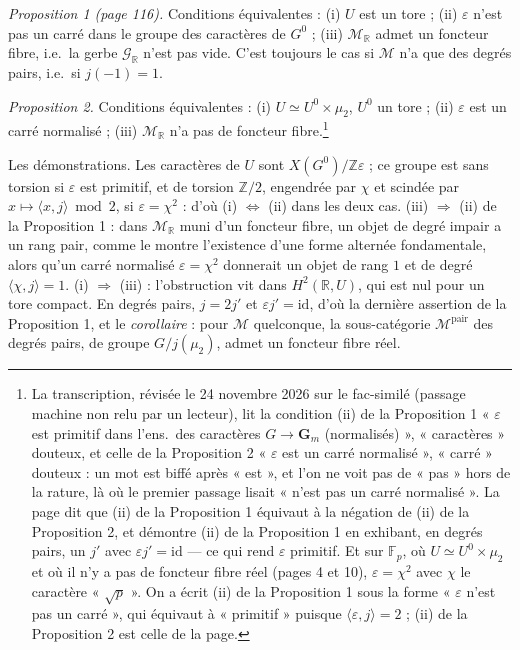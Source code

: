 \documentclass[11pt,a4paper]{article}
\begin{document}
\emph{Proposition 1 (page 116).} Conditions équivalentes : (i) $U$ est un tore ;
(ii) $\varepsilon$ n'est pas un carré dans le groupe des caractères de $G^{0}$ ;
(iii) $\mathcal{M}_{\mathbb{R}}$ admet un foncteur fibre, i.e.\ la gerbe
$\mathcal{G}_{\mathbb{R}}$ n'est pas vide. C'est toujours le cas si
$\mathcal{M}$ n'a que des degrés pairs, i.e.\ si $j(-1) = 1$.

\emph{Proposition 2.} Conditions équivalentes : (i) $U \simeq U^{0} \times
\mu_{2}$, $U^{0}$ un tore ; (ii) $\varepsilon$ est un carré normalisé ; (iii)
$\mathcal{M}_{\mathbb{R}}$ n'a pas de foncteur fibre.\footnote{La transcription,
révisée le 24 novembre 2026 sur le fac-similé (passage machine non relu par un
lecteur), lit la condition (ii) de la Proposition 1 « $\varepsilon$ est primitif
dans l'ens.\ des caractères $G \to \mathbf{G}_{m}$ (normalisés) », « caractères »
douteux, et celle de la Proposition 2 « $\varepsilon$ est un carré normalisé »,
« carré » douteux : un mot est biffé après « est », et l'on ne voit pas de
« pas » hors de la rature, là où le premier passage lisait « n'est pas un
carré normalisé ». La page dit
que (ii) de la Proposition 1 équivaut à la négation de (ii) de la
Proposition 2, et démontre (ii) de la Proposition 1 en exhibant, en degrés
pairs, un $j'$ avec $\varepsilon j' = \mathrm{id}$ --- ce qui rend $\varepsilon$
primitif. Et sur $\mathbb{F}_{p}$, où $U \simeq U^{0} \times \mu_{2}$ et où il n'y
a pas de foncteur fibre réel (pages 4 et 10), $\varepsilon = \chi^{2}$ avec
$\chi$ le caractère « $\sqrt{p}$ ». On a écrit (ii) de la Proposition 1 sous la
forme « $\varepsilon$ n'est pas un carré », qui équivaut à « primitif » puisque
$\langle \varepsilon, j \rangle = 2$ ; (ii) de la Proposition 2 est celle de la
page.}

Les démonstrations. Les caractères de $U$ sont $X(G^{0})/\mathbb{Z}\varepsilon$ ;
ce groupe est sans torsion si $\varepsilon$ est primitif, et de torsion
$\mathbb{Z}/2$, engendrée par $\chi$ et scindée par $x \mapsto \langle x, j
\rangle \bmod 2$, si $\varepsilon = \chi^{2}$ : d'où (i) $\Leftrightarrow$ (ii)
dans les deux cas. (iii) $\Rightarrow$ (ii) de la Proposition 1 : dans
$\mathcal{M}_{\mathbb{R}}$ muni d'un foncteur fibre, un objet de degré impair a un
rang pair, comme le montre l'existence d'une forme alternée fondamentale, alors
qu'un carré normalisé $\varepsilon = \chi^{2}$ donnerait un objet de rang $1$ et
de degré $\langle \chi, j \rangle = 1$. (i) $\Rightarrow$ (iii) : l'obstruction
vit dans $H^{2}(\mathbb{R}, U)$, qui est nul pour un tore compact. En degrés
pairs, $j = 2j'$ et $\varepsilon j' = \mathrm{id}$, d'où la dernière assertion
de la Proposition 1, et le \emph{corollaire} : pour $\mathcal{M}$ quelconque,
la sous-catégorie $\mathcal{M}^{\mathrm{pair}}$ des degrés pairs, de groupe
$G/j(\mu_{2})$, admet un foncteur fibre réel.
\end{document}
